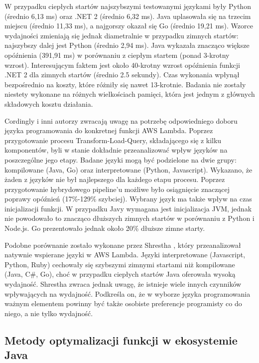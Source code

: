 W przypadku ciepłych startów najszybszymi testowanymi językami były Python (średnio 6,13 ms) oraz  .NET 2 (średnio 6,32 ms). 
Java uplasowała się na trzecim miejscu (średnio 11,33 ms), a najgorszy okazał się Go (średnio 19,21 ms). 
Wzorce wydajności zmieniają się jednak diametralnie w przypadku zimnych startów: najszybszy dalej jest Python (średnio 2,94 ms). 
Java wykazała znacząco większe opóźnienia (391,91 ms) w porównaniu z ciepłym startem (ponad 3-krotny wzrost). 
Interesującym faktem jest około 40-krotny wzrost opóźnienia funkcji .NET 2 dla zimnych startów (średnio 2.5 sekundy). 
Czas wykonania wpłynął bezpośrednio na koszty, które różniły się nawet 13-krotnie. 
Badania nie zostały niestety wykonane na różnych wielkościach pamięci, która jest jednym z głównych składowych kosztu działania.

Cordingly i inni autorzy \cite{Cordingly2020704} zwracają uwagę na potrzebę odpowiedniego doboru języka programowania do konkretnej funkcji AWS Lambda. 
Poprzez przygotowanie procesu Transform-Load-Query, składającego się z kilku komponentów, byli w stanie dokładnie przeanalizować wpływ języków na poszczególne jego etapy. 
Badane języki mogą być podzielone na dwie grupy: kompilowane (Java, Go) oraz interpretowane (Python, Javascript). Wykazano, że żaden z języków nie był najlepszego dla każdego etapu procesu. 
Poprzez przygotowanie hybrydowego pipeline’u możliwe było osiągnięcie znaczącej poprawy opóźnień (17\%-129\% szybciej). Wybrany język ma także wpływ na czas inicjalizacji funkcji. 
W przypadku Javy wymagana jest inicjalizacja JVM, jednak nie powodowało to znacząco dłuższych zimnych startów w porównaniu z Python i Node.js. Go prezentowało jednak około 20\% dłuższe zimne starty.

Podobne porównanie zostało wykonane przez Shrestha \cite{shrestha2019lambda}, który przeanalizował natywnie wspierane języki w AWS Lambda. 
Języki interpretowane (Javascript, Python, Ruby) cechowały się szybszymi zimnymi startami niż kompilowane (Java, C\#, Go), choć w przypadku ciepłych startów Java oferowała wysoką wydajność. 
Shrestha zwraca jednak uwagę, że istnieje wiele innych czynników wpływających na wydajność. 
Podkreśla on, że w wyborze języka programowania ważnym elementem powinny być także osobiste preferencje programisty co do niego, a nie tylko wydajność.

\subsection{Metody optymalizacji funkcji w ekosystemie Java}\label{chapter:przeglad_literatury_wyniki_metody}

